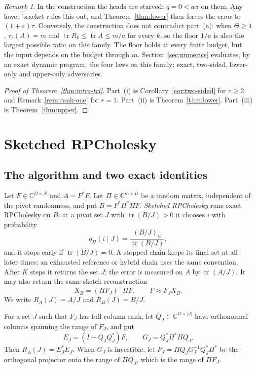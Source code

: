\documentclass[11pt]{article}
\theoremstyle{definition}\newtheorem{definition}[theorem]{Definition}
\theoremstyle{remark}\newtheorem{remark}[theorem]{Remark}
\newcommand{\C}{\mathbb C}
\newcommand{\eps}{\varepsilon}
\newcommand{\tr}{\operatorname{tr}}
\newcommand{\1}{\mathbf 1}
\begin{document}
\begin{remark}\label{rem:floor}
In the construction the heads are starved: $q=0<a\pi$ on them. Any
lower bracket rules this out, and Theorem~\ref{thm:lower} then forces
the error to $(1+\eps)\tau$. Conversely, the construction does not
contradict part~(a): when $\Theta\ge1$, $\tau_r(A)=m$ and
$\tr R_k\le\tr A\le m/a$ for every $k$, so the floor $1/a$ is also the
largest possible ratio on this family.
The floor holds at every finite budget, but the input depends on the
budget through $m$. Section~\ref{sec:numerics} evaluates, by an exact
dynamic program, the four laws on this family: exact, two-sided,
lower-only and upper-only adversaries.
\end{remark}

\begin{proof}[Proof of Theorem~\ref{thm:intro-tri}]
Part~(i) is Corollary~\ref{cor:two-sided} for $r\ge2$ and
Remark~\ref{rem:rank-one} for $r=1$. Part~(ii) is
Theorem~\ref{thm:lower}. Part~(iii) is Theorem~\ref{thm:upper}.
\end{proof}
\section{Sketched RPCholesky}\label{sec:sketch}
\subsection{The algorithm and two exact identities}
Let $F\in\C^{D\times N}$ and $A=F^*F$. Let $\Pi\in\C^{m\times D}$ be a
random matrix, independent of the pivot randomness, and put
$B=F^*\Pi^*\Pi F$. \emph{Sketched RPCholesky} runs exact RPCholesky on
$B$: at a pivot set $J$ with $\tr(B/J)>0$ it chooses $i$ with probability
\[
 q_\Pi(i\mid J)=\frac{(B/J)_{ii}}{\tr(B/J)},
\]
and it stops early if $\tr(B/J)=0$. A stopped chain keeps its final set
at all later times; an exhausted reference or hybrid chain uses the
same convention. After $K$ steps it returns the set
$J$; the error is measured on $A$ by $\tr(A/J)$. It may also return the
same-sketch reconstruction
\[
 X_B=(\Pi F_J)^+\Pi F,\qquad F\approx F_JX_B .
\]
We write $R_A(J)=A/J$ and $R_B(J)=B/J$.

For a set $J$ such that $F_J$ has full column rank, let $Q_J\in\C^{D\times|J|}$
have orthonormal columns spanning the range of $F_J$, and put
\[
 E_J=(I-Q_JQ_J^*)F,\qquad G_J=Q_J^*\Pi^*\Pi Q_J .
\]
Then $R_A(J)=E_J^*E_J$. When $G_J$ is invertible, let
$P_J=\Pi Q_JG_J^{-1}Q_J^*\Pi^*$ be the orthogonal projector onto the
range of $\Pi Q_J$, which is the range of $\Pi F_J$.
\end{document}

